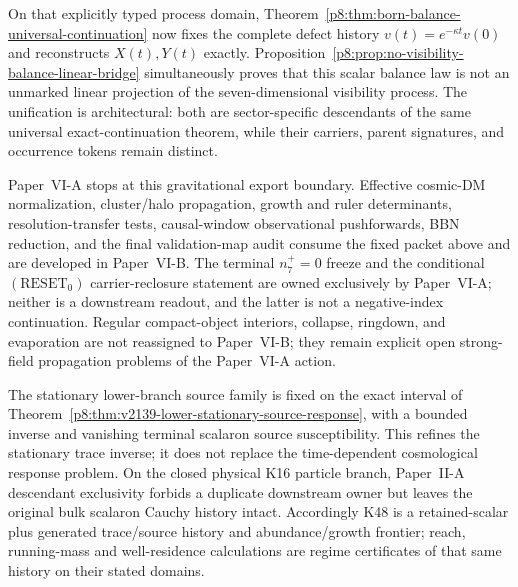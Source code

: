 \documentclass[12pt,a4paper]{article}
\begin{document}
On that explicitly typed process domain,
Theorem~\ref{p8:thm:born-balance-universal-continuation} now fixes the complete
defect history \(v(t)=e^{-\kappa t}v(0)\) and reconstructs \(X(t),Y(t)\)
exactly.  Proposition~\ref{p8:prop:no-visibility-balance-linear-bridge}
simultaneously proves that this scalar balance law is not an unmarked linear
projection of the seven-dimensional visibility process.  The unification is
architectural: both are sector-specific descendants of the same universal
exact-continuation theorem, while their carriers, parent signatures, and
occurrence tokens remain distinct.

Paper~VI-A stops at this gravitational export boundary.  Effective cosmic-DM
normalization, cluster/halo propagation, growth and ruler determinants,
resolution-transfer tests, causal-window observational
pushforwards, BBN reduction, and the final validation-map audit consume the
fixed packet above and are developed in Paper~VI-B.  The terminal \(n_7^+=0\)
freeze and the conditional \((\mathrm{RESET}_0)\) carrier-reclosure statement
are owned exclusively by Paper~VI-A; neither is a downstream readout, and the
latter is not a negative-index continuation.  Regular compact-object
interiors, collapse, ringdown, and evaporation are not reassigned to
Paper~VI-B; they remain explicit open strong-field propagation problems of the
Paper~VI-A action.

The stationary lower-branch source family is fixed on the exact interval of
Theorem~\ref{p8:thm:v2139-lower-stationary-source-response}, with a bounded
inverse and vanishing terminal scalaron source susceptibility.  This refines
the stationary trace inverse; it does not replace the time-dependent
cosmological response problem.  On the closed physical K16 particle branch, Paper~II-A descendant exclusivity
forbids a duplicate downstream owner but leaves the original bulk scalaron
Cauchy history intact.  Accordingly K48 is a retained-scalar plus generated
trace/source history and abundance/growth frontier; reach, running-mass and
well-residence calculations are regime certificates of that same history on
their stated domains.


\end{document}
